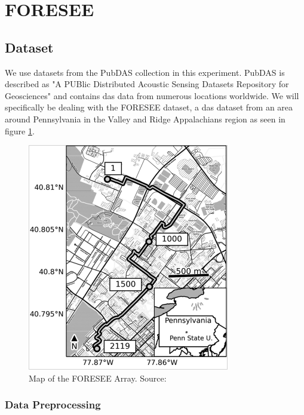 \section{FORESEE}

\subsection{Dataset}

We use datasets from the PubDAS \cite{spica2023pubdas} collection in this experiment. PubDAS is described as "A PUBlic Distributed Acoustic Sensing Datasets Repository for Geosciences" and contains \acrshort{das} data from numerous locations worldwide. We will specifically be dealing with the FORESEE \cite{zhu2019penn} dataset, a \acrshort{das} dataset from an area around Pennsylvania in the Valley and Ridge Appalachians region as seen in figure \ref{fig:foresee}. \\

\begin{figure}[!h]
    \centering
    \includegraphics[width=0.5\linewidth]{figures/foresee.png}
    \caption{Map of the FORESEE Array. Source: \cite{spica2023pubdas}}
    \label{fig:foresee}
\end{figure}

\subsubsection{Data Preprocessing}
\label{exp:fordata}

